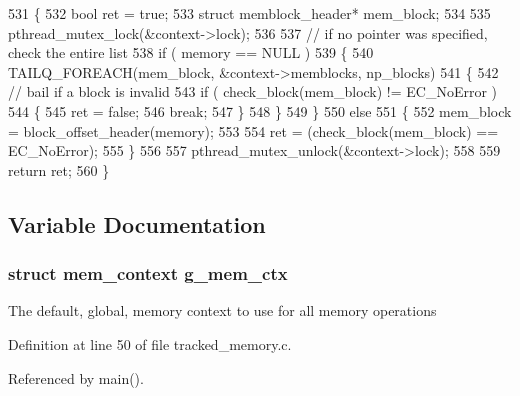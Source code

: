 \begin{DoxyCode}
531 \{
532         \textcolor{keywordtype}{bool}    ret = \textcolor{keyword}{true};
533         \textcolor{keyword}{struct }memblock_header* mem\_block;
534 
535         pthread\_mutex\_lock(&context->lock);
536 
537         \textcolor{comment}{// if no pointer was specified, check the entire list}
538         \textcolor{keywordflow}{if} ( memory == NULL )
539         \{
540                 TAILQ_FOREACH(mem\_block, &context->memblocks, np\_blocks)
541                 \{
542                         \textcolor{comment}{// bail if a block is invalid}
543                         \textcolor{keywordflow}{if} ( check_block(mem\_block) != EC_NoError )
544                         \{
545                                 ret = \textcolor{keyword}{false};
546                                 \textcolor{keywordflow}{break};
547                         \}
548                 \}
549         \}
550         \textcolor{keywordflow}{else}
551         \{
552                 mem\_block = block_offset_header(memory);
553 
554                 ret = (check_block(mem\_block) == EC_NoError);
555         \}
556 
557         pthread\_mutex\_unlock(&context->lock);
558 
559         \textcolor{keywordflow}{return} ret;
560 \}
\end{DoxyCode}


\subsection{Variable Documentation}
\subsubsection[{g\-\_\-mem\-\_\-ctx}]{\setlength{\rightskip}{0pt plus 5cm}struct {\bf mem\-\_\-context} g\-\_\-mem\-\_\-ctx}\label{tracked__memory_8c_a7d7857f56a1eceeb304e53870738e18f}
The default, global, memory context to use for all memory operations 

Definition at line 50 of file tracked\-\_\-memory.\-c.



Referenced by main().

